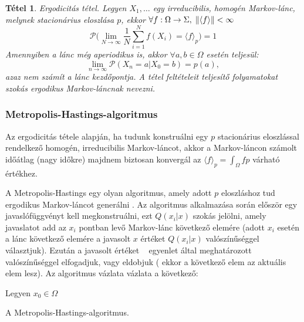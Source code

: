 \documentclass[11pt,a4paper]{article}
\numberwithin{equation}{subsection}
\numberwithin{figure}{section}
\newtheorem{theorem}{Tétel}[section]
\begin{document}
\begin{theorem}{Ergodicitás tétel.}
Legyen $X_1,\dots$ egy irreducibilis, homogén Markov-lánc, melynek stacionárius eloszlása  $p$, ekkor  
$\forall f:\Omega\rightarrow\Sigma ,\;\norm{\langle f\rangle}<\infty$
\begin{equation}
\mathcal{P}\Bigg(\lim_{N\rightarrow\infty}\frac{1}{N}\sum_{i=1}^Nf(X_i)=\langle f \rangle_p\Bigg)=1
\end{equation}
Amennyiben a lánc még aperiodikus is, akkor $\forall a,b\in\Omega$ esetén teljesül: 
\begin{equation}
\lim_{n\rightarrow\infty}\mathcal{P}(X_n=a|X_0=b) = p(a),
\end{equation}
azaz nem számít a lánc kezdőpontja. A tétel feltételeit teljesítő folyamatokat szokás ergodikus Markov-láncnak nevezni.
\end{theorem}


\subsubsection{Metropolis-Hastings-algoritmus}

Az ergodicitás tétele alapján, ha tudunk konstruálni egy $p$ stacionárius eloszlással rendelkező homogén, irreducibilis Markov-láncot, akkor a Markov-láncon számolt időátlag (nagy időkre) majdnem biztosan konvergál az $\langle f \rangle_p=\int_\Omega fp$ várható értékhez.

A Metropolis-Hastings egy olyan algoritmus, amely adott $p$ eloszláshoz tud ergodikus Markov-láncot generálni \cite{Metropolis}. Az algoritmus alkalmazása során először egy javaslófüggvényt kell megkonstruálni, ezt $Q(x_i|x)$ szokás jelölni, amely javaslatot add az $x_i$ pontban levő Markov-lánc következő elemére (adott $x_i$ esetén a lánc következő elemére a javasolt $x$ értéket $Q(x_i|x)$ valószínűséggel választjuk). Ezután a javasolt értéket ~ egyenlet által meghatározott valószínűséggel elfogadjuk, vagy eldobjuk ( ekkor a következő elem az aktuális elem lesz). Az algoritmus vázlata vázlata a következő:

\begin{center}
\begin{algorithm}[H]
Legyen $x_0\in \Omega$\;
 \caption{A Metropolis-Hastings-algoritmus.}
 \label{alg:MH}
\end{algorithm}
\end{center}
\end{document}
